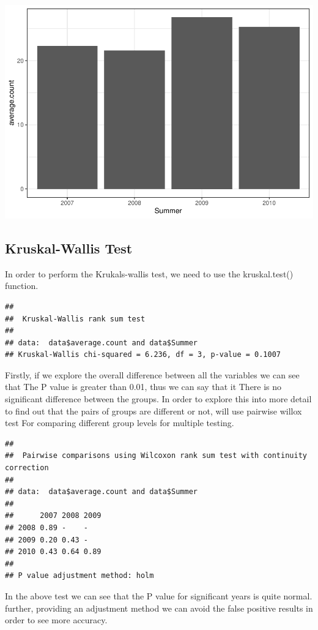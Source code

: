 \documentclass[
]{article}
\begin{document}
\includegraphics{Statistical-analysis-in-RStudio_files/figure-latex/unnamed-chunk-7-1.pdf}

\hypertarget{kruskal-wallis-test}{%
\subsection{Kruskal-Wallis Test}\label{kruskal-wallis-test}}

In order to perform the Krukals-wallis test, we need to use the
kruskal.test() function.

\begin{verbatim}
## 
##  Kruskal-Wallis rank sum test
## 
## data:  data$average.count and data$Summer
## Kruskal-Wallis chi-squared = 6.236, df = 3, p-value = 0.1007
\end{verbatim}

Firstly, if we explore the overall difference between all the variables
we can see that The P value is greater than 0.01, thus we can say that
it There is no significant difference between the groups. In order to
explore this into more detail to find out that the pairs of groups are
different or not, will use pairwise willox test For comparing different
group levels for multiple testing.

\begin{verbatim}
## 
##  Pairwise comparisons using Wilcoxon rank sum test with continuity correction 
## 
## data:  data$average.count and data$Summer 
## 
##      2007 2008 2009
## 2008 0.89 -    -   
## 2009 0.20 0.43 -   
## 2010 0.43 0.64 0.89
## 
## P value adjustment method: holm
\end{verbatim}

In the above test we can see that the P value for significant years is
quite normal. further, providing an adjustment method we can avoid the
false positive results in order to see more accuracy.
\end{document}

